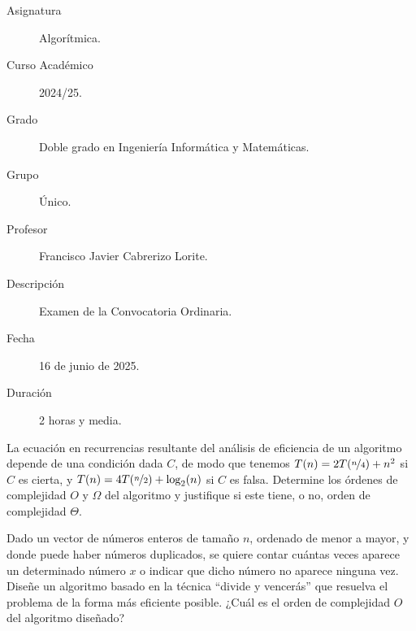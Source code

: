 \documentclass[12pt]{article}
\begin{document}

    
    

    \begin{description}
        \item[Asignatura] Algorítmica.
        \item[Curso Académico] 2024/25.
        \item[Grado] Doble grado en Ingeniería Informática y Matemáticas.
        \item[Grupo] Único.
        \item[Profesor] Francisco Javier Cabrerizo Lorite.
        \item[Descripción] Examen de la Convocatoria Ordinaria.
        \item[Fecha] 16 de junio de 2025.
        \item[Duración] 2 horas y media.
    
    \end{description}
    \newpage


    
    \begin{ejercicio}[2 puntos]
        La ecuación en recurrencias resultante del análisis de eficiencia de un algoritmo depende de una condición dada $C$, de modo que tenemos $T(n) = 2T(\nicefrac{n}{4}) + n^2$ si $C$ es cierta, y $T(n) = 4T(\nicefrac{n}{2}) + \log_2(n)$ si $C$ es falsa. Determine los órdenes de complejidad $O$ y $\Omega$ del algoritmo y justifique si este tiene, o no, orden de complejidad $\Theta$.
    \end{ejercicio}
    
    \begin{ejercicio}[2 puntos]
        Dado un vector de números enteros de tamaño $n$, ordenado de menor a mayor, y donde puede haber números duplicados, se quiere contar cuántas veces aparece un determinado número $x$ o indicar que dicho número no aparece ninguna vez. Diseñe un algoritmo basado en la técnica ``divide y vencerás'' que resuelva el problema de la forma más eficiente posible. ¿Cuál es el orden de complejidad $O$ del algoritmo diseñado?
    \end{ejercicio}
\end{document}
